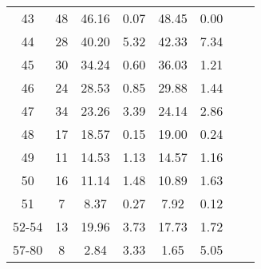 \begin{center}
\begin{table}[H]
\begin{tabular}{cccccccc}
43 & \num{   48} & \num{46.16} & \num{0.07} & \num{48.45} & \num{0.00} \\
44 & \num{   28} & \num{40.20} & \num{5.32} & \num{42.33} & \num{7.34} \\
45 & \num{   30} & \num{34.24} & \num{0.60} & \num{36.03} & \num{1.21} \\
46 & \num{   24} & \num{28.53} & \num{0.85} & \num{29.88} & \num{1.44} \\
47 & \num{   34} & \num{23.26} & \num{3.39} & \num{24.14} & \num{2.86} \\
48 & \num{   17} & \num{18.57} & \num{0.15} & \num{19.00} & \num{0.24} \\
49 & \num{   11} & \num{14.53} & \num{1.13} & \num{14.57} & \num{1.16} \\
50 & \num{   16} & \num{11.14} & \num{1.48} & \num{10.89} & \num{1.63} \\
51 & \num{    7} & \num{8.37} & \num{0.27} & \num{7.92} & \num{0.12} \\
52-54 & \num{   13} & \num{19.96} & \num{3.73} & \num{17.73} & \num{1.72} \\
57-80 & \num{    8} & \num{2.84} & \num{3.33} & \num{1.65} & \num{5.05} \\
\bottomrule
\end{tabular}
\end{table}
\end{center}
